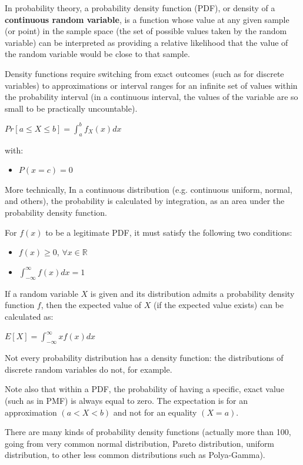 \documentclass{article}
\begin{document}
In probability theory, a probability density function (PDF), or density of a \textbf{continuous random variable}, is a function whose value at any given sample (or point) in the sample space (the set of possible values taken by the random variable) can be interpreted as providing a relative likelihood that the value of the random variable would be close to that sample.

Density functions require switching from exact outcomes (such as for discrete variables) to approximations or interval ranges for an infinite set of values within the probability interval (in a continuous interval, the values of the variable are so small to be practically uncountable).

$\displaystyle Pr[a\leq X\leq b]=\int _{a}^{b}f_{X}(x)dx$

with:
\begin{itemize}
    \item $P(x=c)=0$
    
\end{itemize}

More technically, In a continuous distribution (e.g. continuous uniform, normal, and others), the probability is calculated by integration, as an area under the probability density function.

For $f(x)$ to be a legitimate PDF, it must satisfy the following two conditions:
\begin{itemize}
    \item $f(x) \geq 0$, $\forall x \in \mathbb{R}$
    \item $\displaystyle \int _{-\infty }^{\infty } f(x)dx=1$
\end{itemize}
If a random variable $X$ is given and its distribution admits a probability density function $f$, then the expected value of $X$ (if the expected value exists) can be calculated as:

$\displaystyle {E} [X]=\int _{-\infty }^{\infty }xf(x)dx$

Not every probability distribution has a density function: the distributions of discrete random variables do not, for example.

Note also that within a PDF, the probability of having a specific, exact value (such as in PMF) is always equal to zero. The expectation is for an approximation $(a < X < b)$ and not for an equality $(X = a)$.

There are many kinds of probability density functions (actually more than 100, going from very common normal distribution, Pareto distribution, uniform distribution, to other less common distributions such as Polya-Gamma). 
\end{document}
